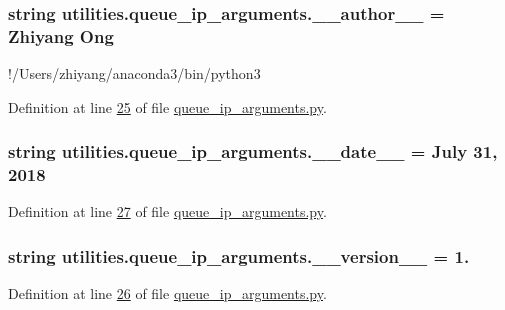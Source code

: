 \subsubsection[{\+\_\+\+\_\+author\+\_\+\+\_\+}]{\setlength{\rightskip}{0pt plus 5cm}string utilities.\+queue\+\_\+ip\+\_\+arguments.\+\_\+\+\_\+author\+\_\+\+\_\+ = \textquotesingle{}Zhiyang Ong\textquotesingle{}}\label{namespaceutilities_1_1queue__ip__arguments_adc999d785e9803ef585833d4c1ae53e4}


!/\+Users/zhiyang/anaconda3/bin/python3 



Definition at line \hyperlink{queue__ip__arguments_8py_source_l00025}{25} of file \hyperlink{queue__ip__arguments_8py_source}{queue\+\_\+ip\+\_\+arguments.\+py}.

\hypertarget{namespaceutilities_1_1queue__ip__arguments_a43f24226d75dbc13271de84f469f6944}{}
\subsubsection[{\+\_\+\+\_\+date\+\_\+\+\_\+}]{\setlength{\rightskip}{0pt plus 5cm}string utilities.\+queue\+\_\+ip\+\_\+arguments.\+\_\+\+\_\+date\+\_\+\+\_\+ = \textquotesingle{}July 31, 2018\textquotesingle{}}\label{namespaceutilities_1_1queue__ip__arguments_a43f24226d75dbc13271de84f469f6944}


Definition at line \hyperlink{queue__ip__arguments_8py_source_l00027}{27} of file \hyperlink{queue__ip__arguments_8py_source}{queue\+\_\+ip\+\_\+arguments.\+py}.

\hypertarget{namespaceutilities_1_1queue__ip__arguments_aac0867ebe34eaed5fb081f33e4ac9740}{}
\subsubsection[{\+\_\+\+\_\+version\+\_\+\+\_\+}]{\setlength{\rightskip}{0pt plus 5cm}string utilities.\+queue\+\_\+ip\+\_\+arguments.\+\_\+\+\_\+version\+\_\+\+\_\+ = \textquotesingle{}1.\textquotesingle{}}\label{namespaceutilities_1_1queue__ip__arguments_aac0867ebe34eaed5fb081f33e4ac9740}


Definition at line \hyperlink{queue__ip__arguments_8py_source_l00026}{26} of file \hyperlink{queue__ip__arguments_8py_source}{queue\+\_\+ip\+\_\+arguments.\+py}.


